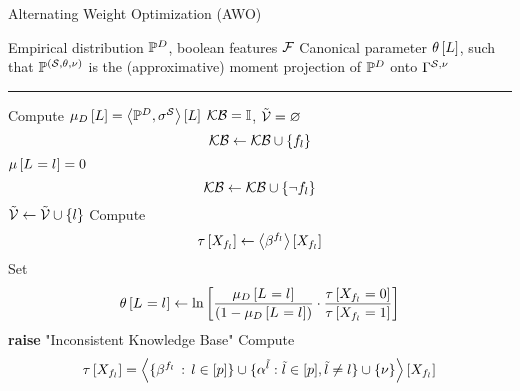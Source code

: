 \begin{algorithm}[hbt!]
    \caption{Alternating Weight Optimization (AWO)}\label{alg:AWO} %
    \begin{algorithmic}
        \Require Empirical distribution $\mathbb{P}^{D}$, boolean features $\mathcal{F}$ %
        \Ensure Canonical parameter $\theta\left[L\right]$, such that $\mathbb{P}^{(\mathcal{S},\theta,\nu)}$ is the (approximative) moment projection of $\mathbb{P}^{D}$ onto $\Gamma^{\mathcal{S},\nu}$
        \hrule
        \State Compute $\mu_{D}\left[L\right]= \left\langle \mathbb{P}^{D},\sigma^{\mathcal{S}}\right\rangle \left[ L \right]$
        \State $\mathcal{KB} = \mathbb{I}$, $\tilde{\mathcal{V}}=\varnothing$
        \For{$\selindexin$}
                \[ \mathcal{KB} \leftarrow \mathcal{KB} \cup \{f_{l}\}\]
            \ElsIf
                    {$\mu\left[L_{}=l_{}\right]=0$}
                \[ \mathcal{KB} \leftarrow \mathcal{KB} \cup \{\lnot f_{l}\}\]
            \Else
                \State $\tilde{\mathcal{V}}\leftarrow \tilde{\mathcal{V}} \cup \{l\}$
            \EndIf
        \EndFor
        \For{$\selindex\in\secnodes$}
            \State Compute
            \[ \tau\left[X_{f_{l}}\right]
            \leftarrow \left\langle \beta^{f_{l}}\right\rangle \left[ X_{f_{l}} \right] \]
            \State Set
            \begin{align*}
                \theta\left[L_{}=l_{}\right]
                \leftarrow \ln \left[ 
                    \frac{\mu_{D}\left[L_{}=l_{}\right]}{(1-\mu_{D}\left[L_{}=l_{}\right])}
                    \cdot \frac{\tau\left[X_{f_{l}}=0\right]}{\tau\left[X_{f_{l}}=1\right]}
                 \right]
            \end{align*}
        \EndFor
            \State \textbf{raise} "Inconsistent Knowledge Base"
        \EndIf
            \For{$\selindex\in\secnodes$}
                \State Compute
                \begin{align*}
                    \hypercoreat{\catvariableof{\enumformula}}
                    = \contractionof{\{\bencodingof{\enumformula} \, : \, \selindexin\}
                    \cup\{\actcoreof{\tilde{\selindex}} : \tilde{\selindex} \in [\seldim], \tilde{\selindex}\neq\selindex\}
                    \cup\{\basemeasure\}}{\catvariableof{\enumformula}}

\end{align*}
\end{algorithmic}
\end{algorithm}
